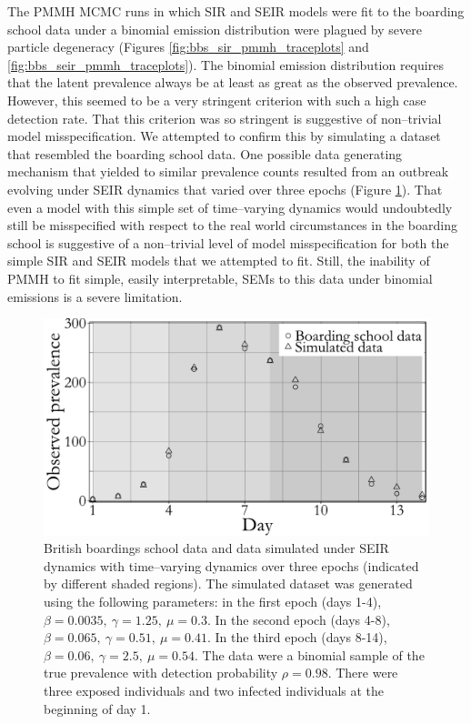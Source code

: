 The PMMH MCMC runs in which SIR and SEIR models were fit to the boarding school data under a binomial emission distribution were plagued by severe particle degeneracy (Figures \ref{fig:bbs_sir_pmmh_traceplots} and \ref{fig:bbs_seir_pmmh_traceplots}). The binomial emission distribution requires that the latent prevalence always be at least as great as the observed prevalence. However, this seemed to be a very stringent criterion with such a high case detection rate. That this criterion was so stringent is suggestive of non--trivial model misspecification. We attempted to confirm this by simulating a dataset that resembled the boarding school data. One possible data generating mechanism that yielded to similar prevalence counts resulted from an outbreak evolving under SEIR dynamics that varied over three epochs (Figure \ref{fig:bbs_dat_sim}). That even a model with this simple set of time--varying dynamics would undoubtedly still be misspecified with respect to the real world circumstances in the boarding school is suggestive of a non--trivial level of model misspecification for both the simple SIR and SEIR models that we attempted to fit. Still, the inability of PMMH to fit simple, easily interpretable, SEMs to this data under binomial emissions is a severe limitation.

\begin{figure}[htbp]
	\centering
	\includegraphics[width=0.6\linewidth]{figures/bbs_dat_sim.pdf}
	\caption{British boardings school data and data simulated under SEIR dynamics with time--varying dynamics over three epochs (indicated by different shaded regions). The simulated dataset was generated using the following parameters: in the first epoch (days 1-4), $ \beta = 0.0035,\ \gamma = 1.25,\  \mu = 0.3$. In the second epoch (days 4-8), $ \beta = 0.065,\ \gamma = 0.51,\ \mu = 0.41 $. In the third epoch (days 8-14), $ \beta = 0.06,\ \gamma = 2.5,\ \mu=0.54 $. The data were a binomial sample of the true prevalence with detection probability $ \rho = 0.98 $. There were three exposed individuals and two infected individuals at the beginning of day 1.}
	\label{fig:bbs_dat_sim}
\end{figure}

